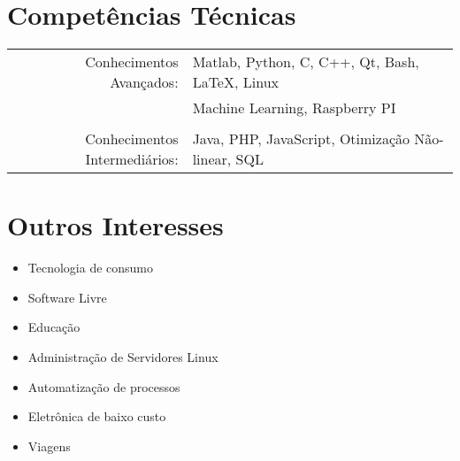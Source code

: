 \documentclass[a4paper,10pt]{article}
\begin{document}
\section{Competências Técnicas}
\begin{tabular}{rl}

    Conhecimentos Avançados:        & Matlab, Python, C, C++, Qt, Bash, \LaTeX, Linux\\
                                    & Machine Learning, Raspberry PI\\
                                    &\\

    Conhecimentos Intermediários:   & Java, PHP, JavaScript, Otimização Não-linear, SQL\\

\end{tabular}

\section{Outros Interesses}

\begin{itemize}
    \item Tecnologia de consumo
    \item Software Livre
    \item Educação
    \item Administração de Servidores Linux
    \item Automatização de processos
    \item Eletrônica de baixo custo
    \item Viagens
\end{itemize}



\vfill
\hrulefill\\
\center{\footnotesize{\today}}
\end{document}
